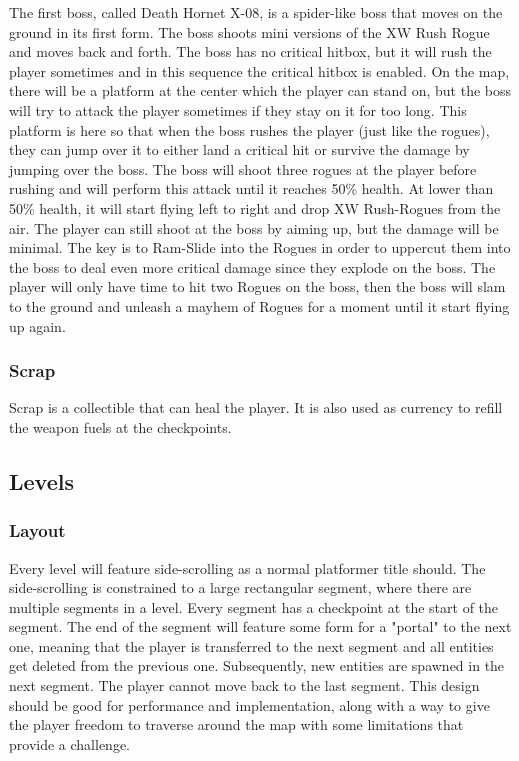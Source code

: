 \documentclass[../Main.tex]{subfiles}
\begin{document}
The first boss, called Death Hornet X-08, is a spider-like boss that moves on the ground in its first form. The boss shoots mini versions of the XW Rush Rogue and moves back and forth. The boss has no critical hitbox, but it will rush the player sometimes and in this sequence the critical hitbox is enabled. On the map, there will be a platform at the center which the player can stand on, but the boss will try to attack the player sometimes if they stay on it for too long. This platform is here so that when the boss rushes the player (just like the rogues), they can jump over it to either land a critical hit or survive the damage by jumping over the boss. The boss will shoot three rogues at the player before rushing and will perform this attack until it reaches 50\% health. At lower than 50\% health, it will start flying left to right and drop XW Rush-Rogues from the air. The player can still shoot at the boss by aiming up, but the damage will be minimal. The key is to Ram-Slide into the Rogues in order to uppercut them into the boss to deal even more critical damage since they explode on the boss. The player will only have time to hit two Rogues on the boss, then the boss will slam to the ground and unleash a mayhem of Rogues for a moment until it start flying up again.

\subsubsection{Scrap}

Scrap is a collectible that can heal the player. It is also used as currency to refill the weapon fuels at the checkpoints. 


\subsection{Levels}

\subsubsection{Layout}

Every level will feature side-scrolling as a normal platformer title should. The side-scrolling is constrained to a large rectangular segment, where there are multiple segments in a level. Every segment has a checkpoint at the start of the segment. The end of the segment will feature some form for a "portal" to the next one, meaning that the player is transferred to the next segment and all entities get deleted from the previous one. Subsequently, new entities are spawned in the next segment. The player cannot move back to the last segment. This design should be good for performance and implementation, along with a way to give the player freedom to traverse around the map with some limitations that provide a challenge. 
\end{document}
